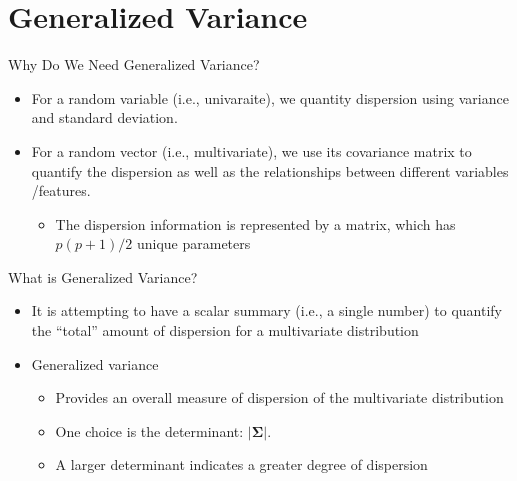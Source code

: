\documentclass[
  ignorenonframetext,
]{beamer}
\providecommand{\tightlist}{%
  \setlength{\itemsep}{0pt}\setlength{\parskip}{0pt}}
\begin{document}
\hypertarget{generalized-variance}{%
\section{Generalized Variance}\label{generalized-variance}}

\begin{frame}{Why Do We Need Generalized Variance?}
\protect\hypertarget{why-do-we-need-generalized-variance}{}
\begin{itemize}
\item
  For a random variable (i.e., univaraite), we quantity dispersion using
  variance and standard deviation.
\item
  For a random vector (i.e., multivariate), we use its covariance matrix
  to quantify the dispersion as well as the relationships between
  different variables /features.

  \begin{itemize}
  \tightlist
  \item
    The dispersion information is represented by a matrix, which has
    \(p(p+1)/2\) unique parameters
  \end{itemize}
\end{itemize}
\end{frame}

\begin{frame}{What is Generalized Variance?}
\protect\hypertarget{what-is-generalized-variance}{}
\begin{itemize}
\item
  It is attempting to have a scalar summary (i.e., a single number) to
  quantify the ``total'' amount of dispersion for a multivariate
  distribution
\item
  Generalized variance

  \begin{itemize}
  \tightlist
  \item
    Provides an overall measure of dispersion of the multivariate
    distribution
  \item
    One choice is the determinant: \(|\boldsymbol \Sigma|\).
  \item
    A larger determinant indicates a greater degree of dispersion
  \end{itemize}
\end{itemize}
\end{frame}
\end{document}
